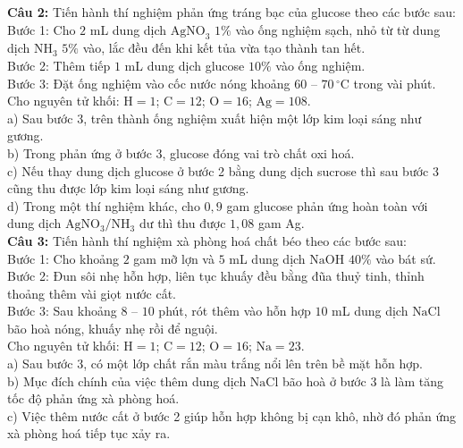 \documentclass[12pt,a4paper]{article}
\begin{document}
\noindent \textbf{Câu 2:} Tiến hành thí nghiệm phản ứng tráng bạc của glucose theo các bước sau:\\
Bước 1: Cho $2$ mL dung dịch $\text{AgNO}_3$ $1\%$ vào ống nghiệm sạch, nhỏ từ từ dung dịch $\text{NH}_3$ $5\%$ vào, lắc đều đến khi kết tủa vừa tạo thành tan hết.\\
Bước 2: Thêm tiếp $1$ mL dung dịch glucose $10\%$ vào ống nghiệm.\\
Bước 3: Đặt ống nghiệm vào cốc nước nóng khoảng $60$ -- $70\,^{\circ}\text{C}$ trong vài phút.\\
Cho nguyên tử khối: $\text{H} = 1$; $\text{C} = 12$; $\text{O} = 16$; $\text{Ag} = 108$.\\
\noindent a) Sau bước 3, trên thành ống nghiệm xuất hiện một lớp kim loại sáng như gương.\\

\noindent b) Trong phản ứng ở bước 3, glucose đóng vai trò chất oxi hoá.\\

\noindent c) Nếu thay dung dịch glucose ở bước 2 bằng dung dịch sucrose thì sau bước 3 cũng thu được lớp kim loại sáng như gương.\\

\noindent d) Trong một thí nghiệm khác, cho $0{,}9$ gam glucose phản ứng hoàn toàn với dung dịch $\mathrm{AgNO_3/NH_3}$ dư thì thu được $1{,}08$ gam Ag.\\

\noindent \textbf{Câu 3:} Tiến hành thí nghiệm xà phòng hoá chất béo theo các bước sau:\\
Bước 1: Cho khoảng $2$ gam mỡ lợn và $5$ mL dung dịch $\text{NaOH}$ $40\%$ vào bát sứ.\\
Bước 2: Đun sôi nhẹ hỗn hợp, liên tục khuấy đều bằng đũa thuỷ tinh, thỉnh thoảng thêm vài giọt nước cất.\\
Bước 3: Sau khoảng $8$ -- $10$ phút, rót thêm vào hỗn hợp $10$ mL dung dịch $\text{NaCl}$ bão hoà nóng, khuấy nhẹ rồi để nguội.\\
Cho nguyên tử khối: $\text{H} = 1$; $\text{C} = 12$; $\text{O} = 16$; $\text{Na} = 23$.\\
\noindent a) Sau bước 3, có một lớp chất rắn màu trắng nổi lên trên bề mặt hỗn hợp.\\

\noindent b) Mục đích chính của việc thêm dung dịch $\text{NaCl}$ bão hoà ở bước 3 là làm tăng tốc độ phản ứng xà phòng hoá.\\

\noindent c) Việc thêm nước cất ở bước 2 giúp hỗn hợp không bị cạn khô, nhờ đó phản ứng xà phòng hoá tiếp tục xảy ra.\\
\end{document}
